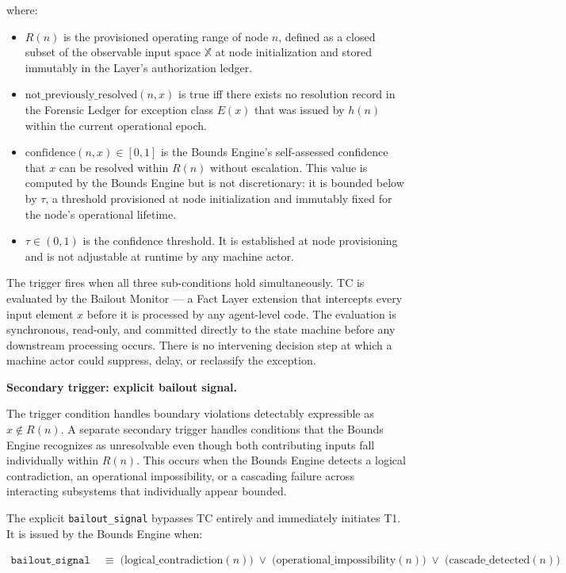 where:
\begin{itemize}\itemsep=0pt
\item $R(n)$ is the provisioned operating range of node $n$, defined as a closed subset of the observable input space $\mathbb{X}$ at node initialization and stored immutably in the \fact{} Layer's authorization ledger.
\item $\text{not\_previously\_resolved}(n, x)$ is true iff there exists no resolution record in the Forensic Ledger for exception class $E(x)$ that was issued by $h(n)$ within the current operational epoch.
\item $\text{confidence}(n, x) \in [0, 1]$ is the Bounds Engine's self-assessed confidence that $x$ can be resolved within $R(n)$ without escalation. This value is computed by the Bounds Engine but is not discretionary: it is bounded below by $\tau$, a threshold provisioned at node initialization and immutably fixed for the node's operational lifetime.
\item $\tau \in (0, 1)$ is the confidence threshold. It is established at node provisioning and is not adjustable at runtime by any machine actor.
\end{itemize}

The trigger fires when all three sub-conditions hold simultaneously. TC is evaluated by the Bailout Monitor --- a Fact Layer extension that intercepts every input element $x$ before it is processed by any agent-level code. The evaluation is synchronous, read-only, and committed directly to the state machine before any downstream processing occurs. There is no intervening decision step at which a machine actor could suppress, delay, or reclassify the exception.

\bigskip
\noindent\textbf{Secondary trigger: explicit bailout signal.}

The trigger condition handles boundary violations detectably expressible as $x \notin R(n)$. A separate secondary trigger handles conditions that the Bounds Engine recognizes as unresolvable even though both contributing inputs fall individually within $R(n)$. This occurs when the Bounds Engine detects a logical contradiction, an operational impossibility, or a cascading failure across interacting subsystems that individually appear bounded.

The explicit \texttt{bailout\_signal} bypasses TC entirely and immediately initiates T1. It is issued by the Bounds Engine when:

\begin{align}
\texttt{bailout\_signal} &\;\equiv\; \bigl(\text{logical\_contradiction}(n)\bigr) \;\lor\; \bigl(\text{operational\_impossibility}(n)\bigr) \;\lor\; \bigl(\text{cascade\_detected}(n)\bigr) \tag{ST}
\end{align}

